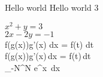 \documentclass[11pt]{article}
\begin{document}
    Hello world
    Hello world 3
    \newline

    \noindent\(x^2+y=3\) \\
    \(2x-2y=-1\) \\



    \large \int \small f(\:g(x)\:)\:g'(x)\: \large dx
    =
    \large \int \small f(t)\: \large dt
    \\

    \int f(g(x))g'(x)\,dx
    =
    \int f(t)\,dt
    \\

    \int_{-N}^{N} e^x\, dx
\end{document}
